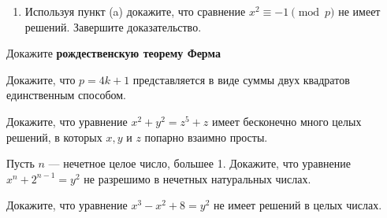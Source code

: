 \documentclass{article}
\begin{document}
\begin{enumerate_boxed}
\begin{enumerate}
            \item Используя пункт (a) докажите, что сравнение $x^2 \equiv -1 \pmod p$ не имеет решений.
            Завершите доказательство.
        \end{enumerate}

        \item Докажите \textbf{рождественскую теорему Ферма}

        \item Докажите, что $p = 4k + 1$ представляется в виде суммы двух квадратов единственным
        способом.

        \item Докажите, что уравнение $x^2 + y^2 = z^5 + z$ имеет бесконечно много целых решений, в
        которых $x, y$ и $z$ попарно взаимно просты.

        \item Пусть $n$ — нечетное целое число, большее 1.
        Докажите, что уравнение $x^n + 2^{n-1} = y^2$ не разрешимо в нечетных натуральных числах.

        \item Докажите, что уравнение $x^3 - x^2 + 8 = y^2$ не имеет решений в целых числах.

    \end{enumerate_boxed}
\end{document}
